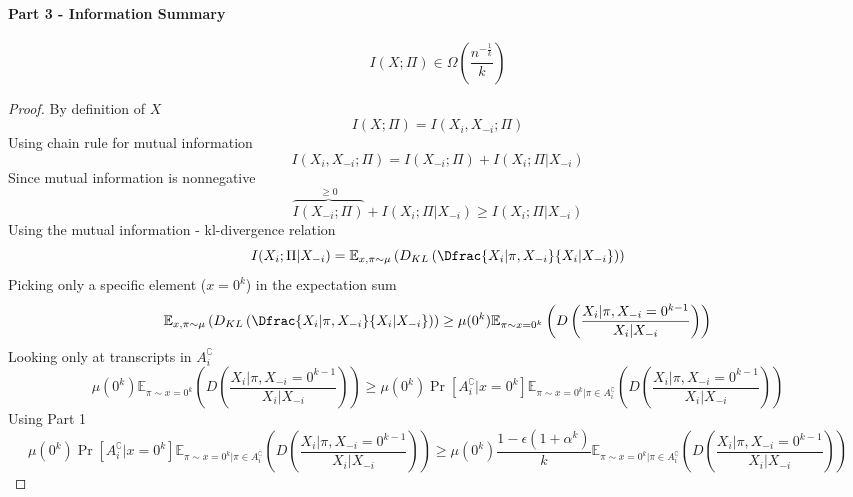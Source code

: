 \paragraph{Part 3 - Information Summary}
\begin{theorem}
\begin{equation*}
    I(X;\Pi) \in \Omega\left(\frac{n^{-\frac{1}{k}}}{k}\right)
\end{equation*}
\end{theorem}
\begin{proof}
By definition of $X$
\begin{equation*}
    I(X;\Pi) = I(X_i,X_{-i};\Pi)
\end{equation*}
Using chain rule for mutual information
\begin{equation*}
    I(X_i,X_{-i};\Pi) = I(X_{-i}; \Pi) + I(X_i;\Pi|X_{-i})
\end{equation*}
Since mutual information is nonnegative
\begin{equation*}
    \overbrace{I(X_{-i}; \Pi)}^{\geq 0} + I(X_i;\Pi|X_{-i}) \geq I(X_i;\Pi|X_{-i})
\end{equation*}
Using the mutual information - kl-divergence relation
\begin{equation*}
    I(X_i;\Pi|X_{-i}) = \mathbb{E}_{x, \pi \sim \mu} \left( D_{KL}\left(\Dfrac{X_i | \pi, X_{-i}}{X_i | X_{-i}} \right) \right)
\end{equation*}
Picking only a specific element ($x=0^k$) in the expectation sum
\begin{equation*}
    \mathbb{E}_{x, \pi \sim \mu} \left( D_{KL}\left(\Dfrac{X_i | \pi, X_{-i}}{X_i | X_{-i}} \right) \right) \geq \mu(0^k) \mathbb{E}_{\pi \sim x = 0^k} \left( D\left(\frac{X_i | \pi, X_{-i} = 0^{k-1}}{X_i | X_{-i}} \right) \right)
\end{equation*}
Looking only at transcripts in $A_{i}^\complement$
\begin{equation*}
    \mu(0^k) \mathbb{E}_{\pi \sim x = 0^k} \left( D\left(\frac{X_i | \pi, X_{-i} = 0^{k-1}}{X_i | X_{-i}} \right) \right) \geq \mu(0^k) \Pr[A_{i}^\complement| x = 0^k] \mathbb{E}_{\pi \sim x = 0^k| \pi \in A_{i}^\complement} \left( D\left(\frac{X_i | \pi, X_{-i} = 0^{k-1}}{X_i | X_{-i}} \right) \right)
\end{equation*}
Using Part 1
\begin{equation*}
    \mu(0^k) \Pr[A_{i}^\complement| x = 0^k] \mathbb{E}_{\pi \sim x = 0^k| \pi \in A_{i}^\complement} \left( D\left(\frac{X_i | \pi, X_{-i} = 0^{k-1}}{X_i | X_{-i}} \right) \right) \geq \mu(0^k) \frac{1 - \epsilon (1 + \alpha ^k)}{k} \mathbb{E}_{\pi \sim x = 0^k| \pi \in A_{i}^\complement} \left( D\left(\frac{X_i | \pi, X_{-i} = 0^{k-1}}{X_i | X_{-i}} \right) \right)

\end{equation*}
\end{proof}
